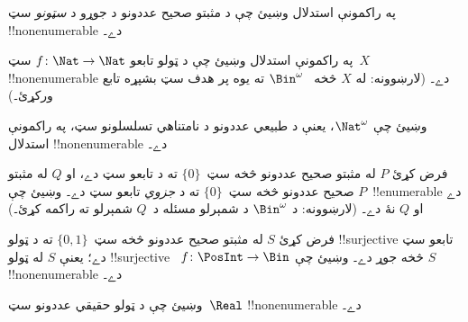 \documentclass[../../../include/open-logic-section]{subfiles}
\begin{document}
\begin{prob}
په راکمونې استدلال وښيئ چې د مثبتو صحيح عددونو د جوړو د
\emph{سټونو} سټ !!{nonenumerable} دے۔
\end{prob}

\begin{prob}\label{sfr:siz:red:prob:nat-nat}
  په راکمونې استدلال وښيئ چې د ټولو تابعو $f\colon \Nat \to \Nat$
  سټ~$X$ !!{nonenumerable} دے۔ (لارښوونه: له $X$ څخه
  ~$\Bin^\omega$ ته يوه پر هدف سټ بشپړه تابع ورکړئ۔)
\end{prob}

\begin{prob}
وښيئ چې $\Nat^\omega$، يعنې د طبيعي عددونو د نامتناهي
تسلسلونو سټ، په راکمونې استدلال !!{nonenumerable} دے۔
\end{prob}

\begin{prob}
فرض کړئ $P$ له مثبتو صحيح عددونو څخه سټ~$\{0\}$ ته د تابعو سټ
دے، او $Q$ له مثبتو صحيح عددونو څخه سټ~$\{0\}$ ته د
\emph{جزوي} تابعو سټ دے۔ وښيئ چې $P$~!!{enumerable} دے او $Q$
نۀ دے۔ (لارښوونه: د $\Bin^\omega$ د شمېرلو مسئله د~$Q$ شمېرلو
ته راکمه کړئ۔)
\end{prob}

\begin{prob}
فرض کړئ $S$ له مثبتو صحيح عددونو څخه سټ~$\{0,1\}$ ته د ټولو
!!{surjective} تابعو سټ دے؛ يعنې $S$ له ټولو !!{surjective}
~$f\colon \PosInt \to \Bin$ څخه جوړ دے۔ وښيئ چې $S$
!!{nonenumerable} دے۔
\end{prob}

\begin{prob}
وښيئ چې د ټولو حقيقي عددونو سټ~$\Real$ !!{nonenumerable} دے۔
\end{prob}
\end{document}
